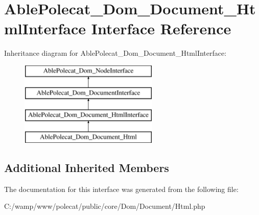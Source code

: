 \hypertarget{interface_able_polecat___dom___document___html_interface}{}\section{Able\+Polecat\+\_\+\+Dom\+\_\+\+Document\+\_\+\+Html\+Interface Interface Reference}
\label{interface_able_polecat___dom___document___html_interface}
Inheritance diagram for Able\+Polecat\+\_\+\+Dom\+\_\+\+Document\+\_\+\+Html\+Interface\+:\begin{figure}[H]
\begin{center}
\leavevmode
\includegraphics[height=4.000000cm]{interface_able_polecat___dom___document___html_interface}
\end{center}
\end{figure}
\subsection*{Additional Inherited Members}


The documentation for this interface was generated from the following file\+:\begin{DoxyCompactItemize}
\item 
C\+:/wamp/www/polecat/public/core/\+Dom/\+Document/Html.\+php\end{DoxyCompactItemize}

